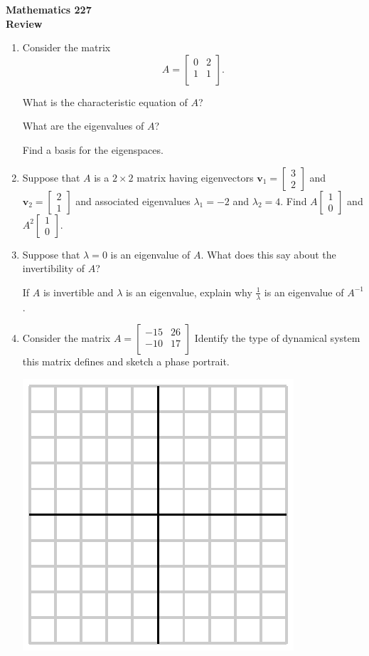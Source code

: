 \documentclass[12pt]{article}
\newcommand{\vs}[1]{\vspace{#1in}}
\newcommand{\vvec}{{\mathbf v}}
\newcommand{\twovec}[2]{\left[\begin{array}{r}#1 \\ #2
    \end{array}\right]}
\begin{document}
\noindent
{\bf Mathematics 227} \\ 
{\bf Review}

\begin{enumerate}
\item Consider the matrix
  $$
  A =
  \left[
    \begin{array}{cc}
      0 & 2 \\
      1 & 1 \\
    \end{array}
  \right].
  $$

  What is the characteristic equation of $A$?

  \vs{1}
  What are the eigenvalues of $A$?

  \vs{1}
  Find a basis for the eigenspaces.

  \vs{1.5}
\item Suppose that $A$ is a $2\times2$ matrix having eigenvectors
  $\vvec_1=\twovec32$ and $\vvec_2=\twovec21$ and associated eigenvalues
  $\lambda_1 = -2$ and $\lambda_2 = 4$.  Find $A\twovec10$ and
  $A^2\twovec10$.  

  \newpage

\item Suppose that $\lambda = 0$ is an eigenvalue of $A$.  What does
  this say about the invertibility of $A$?

  \vs{1}
  If $A$ is invertible and $\lambda$ is an eigenvalue, explain why
  $\frac1\lambda$ is an eigenvalue of $A^{-1}$.

  \vs{1}

\item Consider the matrix
  $A =
  \left[
    \begin{array}{cc}
      -15 & 26 \\
      -10 & 17 \\
    \end{array}
  \right]
  $
  Identify the type of dynamical system this matrix defines and sketch
  a phase portrait.

  \includegraphics{empty.eps}


\end{enumerate}
\end{document}
